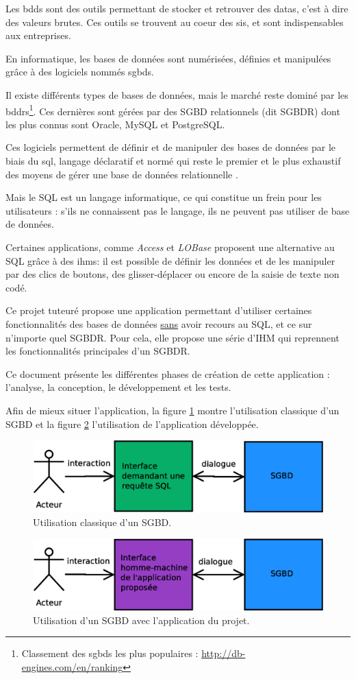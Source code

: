 Les \glspl{bdd} sont des outils permettant de stocker et retrouver des \glspl{data}, c'est à dire des valeurs brutes. 
Ces outils se trouvent au coeur des \glspl{si}, et sont indispensables aux entreprises.

En informatique, les bases de données sont numérisées, définies et manipulées grâce à des logiciels nommés \glspl{sgbd}.

Il existe différents types de bases de données, mais le marché reste dominé par les \glspl{bddr}\footnote{\label{part_de_marché_relationnel}
Classement des \glspl{sgbd} les plus populaires : \url{http://db-engines.com/en/ranking}}. Ces dernières sont gérées par des SGBD relationnels (dit SGBDR) 
dont les plus connus sont Oracle, MySQL et PostgreSQL.

Ces logiciels permettent de définir et de manipuler des bases de données par le biais du \gls{sql}, 
langage déclaratif et normé qui reste le premier et le plus exhaustif des moyens de gérer une base de données relationnelle .

Mais le SQL est un langage informatique, ce qui constitue un frein pour les utilisateurs : s'ils ne connaissent pas
le langage, ils ne peuvent pas utiliser de base de données.

Certaines applications, comme \textit{Access} et \textit{LOBase} proposent une alternative au SQL grâce à des 
\glspl{ihm}: il est possible de définir les données et de les manipuler par des clics de boutons, des glisser-déplacer ou encore de la saisie
de texte non codé. 

Ce projet tuteuré propose une application permettant d'utiliser certaines fonctionnalités 
des bases de données \underline{sans} 
avoir recours au SQL, et ce sur n'importe quel SGBDR. Pour cela, elle propose une série d'IHM qui reprennent les fonctionnalités
principales d'un SGBDR.

Ce document présente les différentes phases de création de cette application : l'analyse, la conception, le développement et les tests.

Afin de mieux situer l'application, la figure \ref{sans_idb_schema} montre l'utilisation classique d'un SGBD et 
la figure \ref{avec_idb_schema} l'utilisation de l'application développée.

\begin{figure}[!h]
  \centering
  \includegraphics[width=14cm]{images/sans_idb.eps}
  \caption{Utilisation classique d'un SGBD.}
  \label{sans_idb_schema}
\end{figure}

\begin{figure}[!h]
  \centering
  \includegraphics[width=14cm]{images/avec_idb.eps}
  \caption{Utilisation d'un SGBD avec l'application du projet.}
  \label{avec_idb_schema}
\end{figure}
